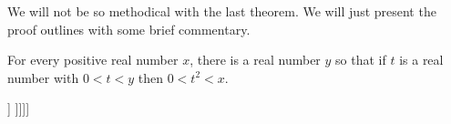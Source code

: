  

We will not be so methodical with the last theorem.  We will just present the proof outlines with some brief commentary.
 
\begin{theorem}	
	For every positive real number $x$, there is a real number $y$ so that if $t$ is a real number with $0<t<y$ then $0<t^2<x$.
	\end{theorem}



\begin{center}
		\begin{forest}
				[$\forall x \in \mathbb{R}$ [$\implies$[$x>0$][ $\exists y \in \mathbb{R}$ [ $\forall t \in \mathbb{R}$ [$\implies$ [$0<t<y$][$0<t^2<x$]] ]]]]
			\end{forest}
	\end{center}

